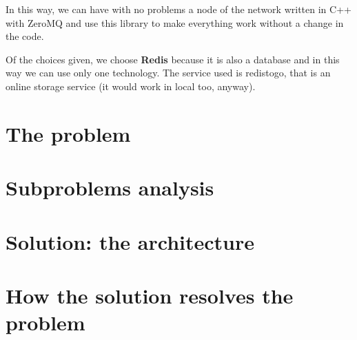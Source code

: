 In this way, we can have with no problems a node of the network written in C++ with ZeroMQ and use this library to make everything work without a change in the code.

Of the choices given, we choose \textbf{Redis} because it is also a database and in this way we can use only one technology. The service used is redistogo, that is an online storage service (it would work in local too, anyway).

\section{The problem}

\section{Subproblems analysis}

\section{Solution: the architecture}

\section{How the solution resolves the problem}





